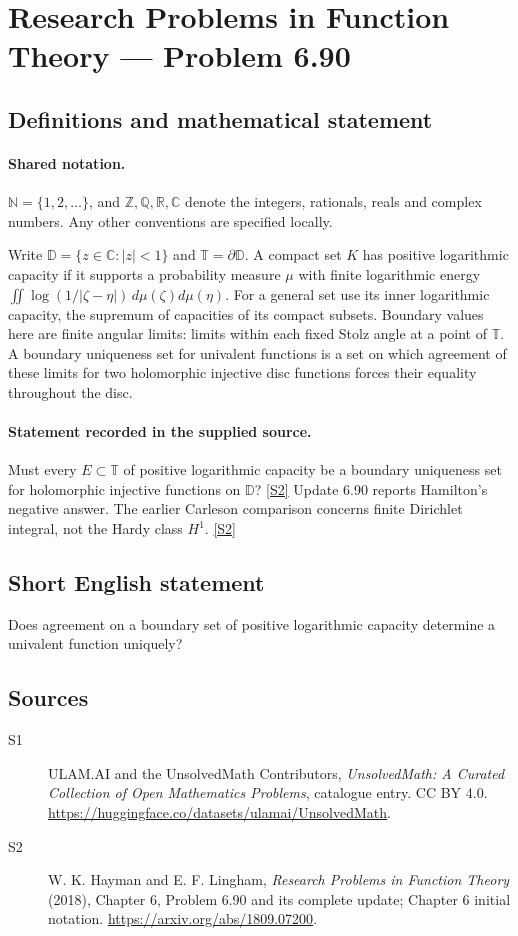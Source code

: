\documentclass[11pt]{article}
\newcommand{\sref}[2]{\hyperlink{source:#1:#2}{[S#2]}}
\begin{document}
\section{Research Problems in Function Theory — Problem 6.90}\label{statement}

\subsection{Definitions and mathematical statement}

\paragraph{Shared notation.}$\mathbb N=\{1,2,\ldots\}$, and $\mathbb Z,\mathbb Q,\mathbb R,\mathbb C$ denote the integers, rationals, reals and complex numbers. Any other conventions are specified locally.


Write $\mathbb D=\{z\in\mathbb C:|z|<1\}$ and $\mathbb T=\partial\mathbb D$. A compact set $K$ has positive logarithmic capacity if it supports a probability measure $\mu$ with finite logarithmic energy $\iint\log(1/|\zeta-\eta|)\,d\mu(\zeta)d\mu(\eta)$. For a general set use its inner logarithmic capacity, the supremum of capacities of its compact subsets. Boundary values here are finite angular limits: limits within each fixed Stolz angle at a point of $\mathbb T$. A boundary uniqueness set for univalent functions is a set on which agreement of these limits for two holomorphic injective disc functions forces their equality throughout the disc.
\paragraph{Statement recorded in the supplied source.}
Must every $E\subset\mathbb T$ of positive logarithmic capacity be a boundary uniqueness set for holomorphic injective functions on $\mathbb D$? \sref{statement}{2}
Update 6.90 reports Hamilton's negative answer. The earlier Carleson comparison concerns finite Dirichlet integral, not the Hardy class $H^1$. \sref{statement}{2}
\subsection{Short English statement}
Does agreement on a boundary set of positive logarithmic capacity determine a univalent function uniquely?
\subsection{Sources}
\begin{description}
\item[\hypertarget{source:statement:1}{S1}] ULAM.AI and the UnsolvedMath Contributors, \emph{UnsolvedMath: A Curated Collection of Open Mathematics Problems}, catalogue entry. CC BY 4.0. \url{https://huggingface.co/datasets/ulamai/UnsolvedMath}.
\item[\hypertarget{source:statement:2}{S2}] W. K. Hayman and E. F. Lingham, \emph{Research Problems in Function Theory} (2018), Chapter 6, Problem 6.90 and its complete update; Chapter 6 initial notation. \url{https://arxiv.org/abs/1809.07200}.
\end{description}
\label{end:statement}
\end{document}
